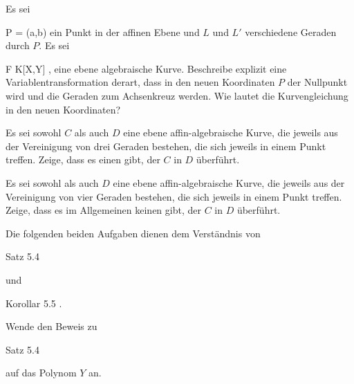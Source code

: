 {}
{





Es sei

\mavergleichskette
{\vergleichskette
{ P
}
{ = }{ (a,b)
}
{  }{
}
{    }{
}
{   }{
}
}
{}{}{}
ein Punkt in der affinen Ebene und $L$ und $L'$ verschiedene Geraden durch $P$. Es sei

 {}
 {F \in K[X,Y]} {}
 {} {} {} {,}
eine ebene algebraische Kurve. Beschreibe explizit eine Variablentransformation
 {} {}
derart, dass in den neuen Koordinaten $P$ der Nullpunkt wird und die Geraden zum Achsenkreuz werden. Wie lautet die Kurvengleichung in den neuen Koordinaten?





}
{} {}

{}
{





Es sei sowohl $C$ als auch $D$ eine ebene affin-algebraische Kurve, die jeweils aus der Vereinigung von drei
 {} {}
Geraden bestehen, die sich jeweils in einem Punkt treffen. Zeige, dass es einen
gibt, der $C$ in $D$ überführt.





}
{} {}

{}
{





Es sei sowohl
 als auch $D$ eine ebene affin-algebraische Kurve, die jeweils aus der Vereinigung von vier
 {} {}
Geraden bestehen, die sich jeweils in einem Punkt treffen. Zeige, dass es im Allgemeinen keinen
gibt, der $C$ in $D$ überführt.





}
{} {}

Die folgenden beiden Aufgaben dienen dem Verständnis von

Satz 5.4

und

Korollar 5.5
.

{}
{





Wende den Beweis zu

Satz 5.4

auf das Polynom $Y$
an.





}
{} {}

